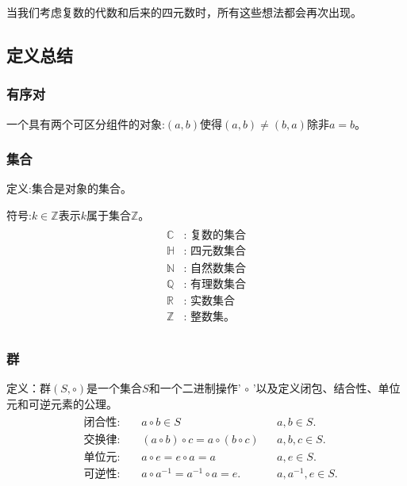 当我们考虑复数的代数和后来的四元数时，所有这些想法都会再次出现。

\subsection{定义总结}
\subsubsection*{有序对}
一个具有两个可区分组件的对象:$(a, b)$使得$(a, b) \neq(b, a)$除非$a=b$。

\subsubsection*{集合}
定义:集合是对象的集合。

符号:$k \in \mathbb{Z}$表示$k$属于集合$\mathbb{Z}$。
\begin{align*}
    \begin{aligned}
        \mathbb{C} &\text{: 复数的集合}\\
        \mathbb{H} &\text{: 四元数集合}\\
        \mathbb{N} &\text{: 自然数集合}\\
        \mathbb{Q} &\text{: 有理数集合}\\
        \mathbb{R} &\text{: 实数集合}\\      
        \mathbb{Z} &\text{: 整数集。}\\
    \end{aligned}
\end{align*}

\subsubsection*{群}
定义：群$(S, \circ)$是一个集合$S$和一个二进制操作' $\circ$ '以及定义闭包、结合性、单位元和可逆元素的公理。
\begin{align*}
    \begin{aligned}
        &\textbf{闭合性:   } && a \circ b \in S && a, b \in S.\\
        &\textbf{交换律:   } && (a \circ b) \circ c=a \circ(b \circ c) && a, b, c \in S.\\
        &\textbf{单位元:   } && a \circ e=e \circ a=a && a, e \in S.\\
        &\textbf{可逆性:   } && a \circ a^{-1}=a^{-1} \circ a=e. && a, a^{-1}, e \in S.
    \end{aligned}
\end{align*}

